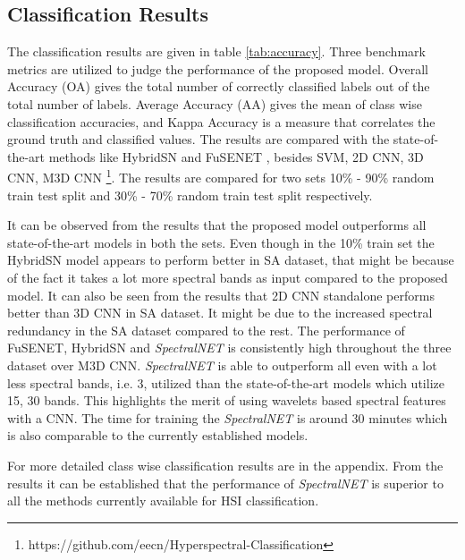 \documentclass[journal]{IEEEtran}
\begin{document}
\subsection{Classification Results}
The classification results are given in table \ref{tab:accuracy}. Three benchmark metrics are utilized to judge the performance of the proposed model. Overall Accuracy (OA) gives the total number of correctly classified labels out of the total number of labels. Average Accuracy (AA) gives the mean of class wise classification accuracies, and Kappa Accuracy is a measure that correlates the ground truth and classified values. The results are compared with the state-of-the-art methods like HybridSN \cite{8736016} and FuSENET \cite{iet:/content/journals/10.1049/iet-ipr.2019.1462}, besides SVM, 2D CNN, 3D CNN, M3D CNN \cite{8297014} \footnote{https://github.com/eecn/Hyperspectral-Classification}. The results are compared for two sets 10\% - 90\% random train test split and 30\% - 70\% random train test split respectively.

It can be observed from the results that the proposed model outperforms all state-of-the-art models in both the sets. Even though in the 10\% train set the HybridSN model appears to perform better in SA dataset, that might be because of the fact it takes a lot more spectral bands as input compared to the proposed model. It can also be seen from the results that 2D CNN standalone performs better than 3D CNN in SA dataset. It might be due to the increased spectral redundancy in the SA dataset compared to the rest. The performance of FuSENET, HybridSN and \textit{SpectralNET} is consistently high throughout the three dataset over M3D CNN. \textit{SpectralNET} is able to outperform all even with a lot less spectral bands, i.e. 3, utilized than the state-of-the-art models which utilize 15, 30 bands. This highlights the merit of using wavelets based spectral features with a CNN. The time for training the \textit{SpectralNET} is around 30 minutes which is also comparable to the currently established models. 

For more detailed class wise classification results are in the appendix. From the results it can be established that the performance of \textit{SpectralNET} is superior to all the methods currently available for HSI classification. 
\end{document}
